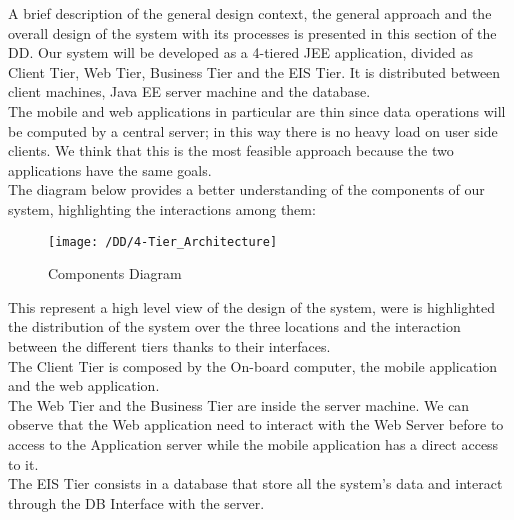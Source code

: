 A brief description of the general design context, the general approach and the overall design of the system with its processes is presented in this section of the DD.
Our system will be developed as a 4-tiered JEE application, divided as Client Tier, Web Tier, Business Tier and the EIS Tier. It is distributed between client machines, Java EE server machine and the database.
\\The mobile and web applications in particular are thin since data operations will be computed by a central server; in this way there is no heavy load on user side clients. We think that this is the most feasible approach because the two applications have the same goals. 
\\The diagram below provides a better understanding of the components of our system, highlighting the interactions among them:
\begin{figure}[!ht]
  \centering
  \vspace{0.2cm}
  \texttt{[image: /DD/4-Tier\_Architecture]}\\
  \vspace{0.4cm}
  \caption{Components Diagram} 
  \label{fig:4-Tier_Architecture} 
\end{figure}

This represent a high level view of the design of the system, were is highlighted the distribution of the system over the three locations and the interaction between the different tiers thanks to their interfaces.
\\The Client Tier is composed by the On-board computer, the mobile application and the web application.
\\The Web Tier and the Business Tier are inside the server machine. We can observe that the Web application need to interact with the Web Server before to access to the Application server while the mobile application has a direct access to it.
\\The EIS Tier consists in a database that store all the system's data and interact through the DB Interface with the server.
